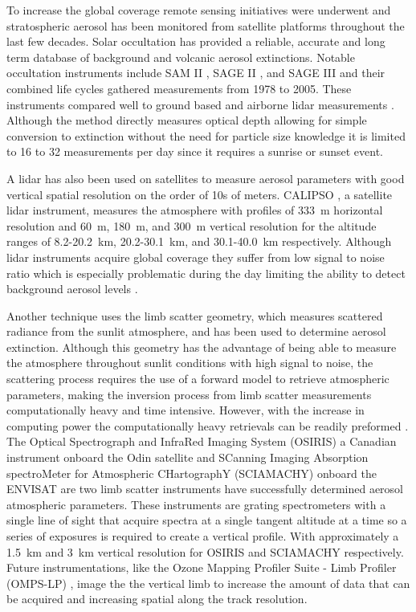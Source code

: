 \documentclass[12pt]{article}
\begin{document}
To increase the global coverage remote sensing initiatives were underwent and stratospheric aerosol has been monitored from satellite platforms throughout the last few decades. Solar occultation has provided a reliable, accurate and long term database of background and volcanic aerosol extinctions. Notable occultation instruments include SAM II \citep{McCormick1979}, SAGE II \citep{McCormick1987}, and SAGE III \citep{Thomason2003} and their combined life cycles gathered measurements from 1978 to 2005. These instruments compared well to ground based and airborne lidar measurements \citep{Russell1989}. Although the method directly measures optical depth allowing for simple conversion to extinction without the need for particle size knowledge it is limited to 16 to 32 measurements per day since it requires a sunrise or sunset event.

A lidar has also been used on satellites to measure aerosol parameters with good vertical spatial resolution on the order of 10s of meters. CALIPSO \citep{Winker2007}, a satellite lidar instrument, measures the atmosphere with profiles of 333~m horizontal resolution and 60~m, 180~m, and 300~m vertical resolution for the altitude ranges of 8.2-20.2~km, 20.2-30.1~km, and 30.1-40.0~km respectively. Although lidar instruments acquire global coverage they suffer from low signal to noise ratio which is especially problematic during the day limiting the ability to detect background aerosol levels \citep{Kacenelenbogen2011}.

Another technique uses the limb scatter geometry, which measures scattered radiance from the sunlit atmosphere, and has been used to determine aerosol extinction. Although this geometry has the advantage of being able to measure the atmosphere throughout sunlit conditions with high signal to noise, the scattering process requires the use of a forward model to retrieve atmospheric parameters, making the inversion process from limb scatter measurements computationally heavy and time intensive. However, with the increase in computing power the computationally heavy retrievals can be readily preformed \citep{Bourassa2012a}. The Optical Spectrograph and InfraRed Imaging System (OSIRIS) a Canadian instrument onboard the Odin satellite \citep{Llewellyn2004} and SCanning Imaging Absorption spectroMeter for Atmospheric CHartographY (SCIAMACHY) onboard the ENVISAT \citep{Bovensmann1999} are two limb scatter instruments have successfully determined aerosol atmospheric parameters. These instruments are grating spectrometers with a single line of sight that acquire spectra at a single tangent altitude at a time so a series of exposures is required to create a vertical profile. With approximately a 1.5~km and 3~km vertical resolution for OSIRIS and SCIAMACHY respectively. Future instrumentations, like the Ozone Mapping Profiler Suite - Limb Profiler (OMPS-LP) \citep{Rault2013}, image the the vertical limb to increase the amount of data that can be acquired and increasing spatial along the track resolution.
\end{document}
